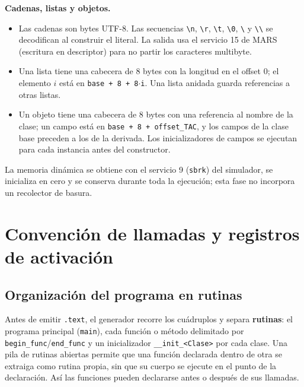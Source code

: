 \documentclass[11pt,a4paper]{article}
\newcommand{\subhead}[1]{\par\medskip\noindent\textbf{#1}\par\nopagebreak\smallskip}
\begin{document}
\subhead{Cadenas, listas y objetos.}

\begin{itemize}[leftmargin=1.4em]
  \item Las cadenas son bytes UTF-8. Las secuencias \texttt{\textbackslash n},
        \texttt{\textbackslash r}, \texttt{\textbackslash t}, \texttt{\textbackslash 0},
        \texttt{\textbackslash\textquotedbl} y \texttt{\textbackslash\textbackslash} se
        decodifican al construir el literal. La salida usa el servicio 15 de MARS
        (escritura en descriptor) para no partir los caracteres multibyte.
  \item Una lista tiene una cabecera de 8 bytes con la longitud en el offset 0;
        el elemento $i$ está en \texttt{base + 8 + 8$\cdot$i}. Una lista anidada
        guarda referencias a otras listas.
  \item Un objeto tiene una cabecera de 8 bytes con una referencia al nombre de
        la clase; un campo está en \texttt{base + 8 + offset\_TAC}, y los campos de
        la clase base preceden a los de la derivada. Los inicializadores de
        campos se ejecutan para cada instancia antes del constructor.
\end{itemize}

La memoria dinámica se obtiene con el servicio 9 (\texttt{sbrk}) del simulador,
se inicializa en cero y se conserva durante toda la ejecución; esta fase no
incorpora un recolector de basura.

\section{Convención de llamadas y registros de activación}

\subsection{Organización del programa en rutinas}

Antes de emitir \texttt{.text}, el generador recorre los cuádruplos y separa
\textbf{rutinas}: el programa principal (\texttt{main}), cada función o método
delimitado por \texttt{begin\_func}/\texttt{end\_func} y un inicializador
\texttt{\_\_init\_<Clase>} por cada clase. Una pila de rutinas abiertas permite
que una función declarada dentro de otra se extraiga como rutina propia, sin
que su cuerpo se ejecute en el punto de la declaración. Así las funciones pueden
declararse antes o después de sus llamadas.
\end{document}
